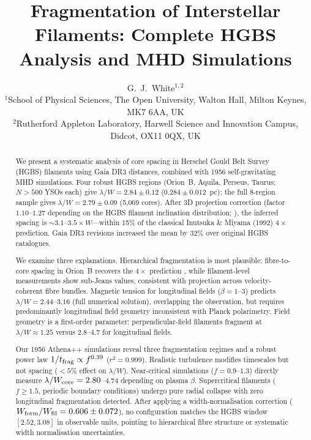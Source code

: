 \documentclass[twoside,twocolumn]{mnras}
\title{Fragmentation of Interstellar Filaments: Complete HGBS Analysis and MHD Simulations}
\author[G.~J.~White]{G.~J.~White$^{1,2}$\\
$^{1}$School of Physical Sciences, The Open University, Walton Hall, Milton Keynes, MK7 6AA, UK\\
$^{2}$Rutherford Appleton Laboratory, Harwell Science and Innovation Campus, Didcot, OX11 0QX, UK}
\begin{document}
\maketitle

\begin{abstract}
We present a systematic analysis of core spacing in Herschel Gould Belt Survey (HGBS)
filaments using Gaia DR3 distances, combined with 1956 self-gravitating MHD simulations.
Four robust HGBS regions (Orion~B, Aquila, Perseus, Taurus; $N>500$ YSOs each) give
$\lambda/W = 2.84 \pm 0.12$ ($0.284 \pm 0.012$~pc); the full 8-region sample gives
$\lambda/W = 2.79 \pm 0.09$ (5,069 cores). After 3D projection correction (factor $1.10$--$1.27$ depending on the HGBS filament inclination distribution; \citealt{Andre2010, Planck2016}),
the inferred spacing is ${\sim}3.1$--$3.5\times W$---within 15\% of the classical
Inutsuka \& Miyama (1992) $4\times$ prediction. Gaia DR3 revisions increased
the mean by 32\% over original HGBS catalogues.

We examine three explanations. Hierarchical fragmentation is most plausible: fibre-to-core
spacing in Orion~B recovers the $4\times$ prediction \citep{Yang2024}, while
filament-level measurements show sub-Jeans values, consistent with projection across
velocity-coherent fibre bundles. Magnetic tension for longitudinal fields ($\beta = 1$--$3$)
predicts $\lambda/W = 2.44$--$3.16$ (full numerical solution), overlapping the observation,
but requires predominantly longitudinal field geometry inconsistent with Planck polarimetry.
Field geometry is a first-order parameter: perpendicular-field filaments fragment at
$\lambda/W \approx 1.25$ versus $2.8$--$4.7$ for longitudinal fields.

Our 1956 Athena++ simulations reveal three fragmentation regimes and a robust power law
$1/t_{\rm frag} \propto f^{0.39}$ ($r^2 = 0.999$). Realistic turbulence modifies
timescales but not spacing ($<5\%$ effect on $\lambda/W$). Near-critical simulations
($f = 0.9$--$1.3$) directly measure $\lambda/W_{\rm core} = 2.80$--$4.74$ depending on
plasma $\beta$. Supercritical filaments ($f \geq 1.5$, periodic boundary conditions)
undergo pure radial collapse with zero longitudinal fragmentation detected.
After applying a width-normalisation correction ($W_{\rm form}/W_{\rm fil} = 0.606 \pm 0.072$),
no configuration matches the HGBS window $[2.52, 3.08]$ in observable units, pointing to
hierarchical fibre structure or systematic width normalisation uncertainties.
\end{abstract}
\end{document}

